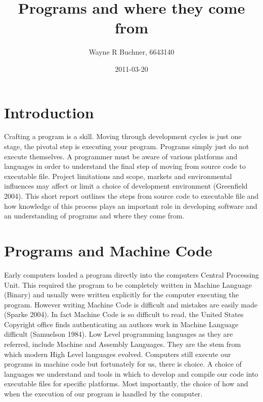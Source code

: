 \documentclass[a4paper]{article}
\title{Programs and where they come from}
\author{Wayne R Buchner, 6643140}
\date{2011-03-20}
\begin{document}
\ifpdf
{}
\else
{}
\fi

\maketitle


\section*{Introduction}
Crafting a program is a skill. Moving through development cycles is just one stage, the pivotal step is executing your program. Programs simply just do not execute themselves. A programmer must be aware of various platforms and languages in order to understand the final step of moving from source code to executable file. Project limitations and scope, markets and environmental influences may affect or limit a choice of development environment (Greenfield 2004). This short report outlines the steps from source code to executable file and how knowledge of this process plays an important role in developing software and an understanding of programs and where they come from. 

\section*{Programs and Machine Code}
Early computers loaded a program directly into the computers Central Processing Unit. This required the program to be completely written in Machine Language (Binary) and usually were written explicitly for the computer executing the program. However writing Machine Code is difficult and mistakes are easily made (Sparke 2004). In fact Machine Code is so difficult to read, the United States Copyright office finds authenticating an authors work in Machine Language difficult (Samuelson 1984). Low Level programming languages as they are referred, include Machine and Assembly Languages. They are the stem from which modern High Level languages evolved. Computers still execute our programs in machine code but fortunately for us, there is choice. A choice of languages we understand and tools in which to develop and compile our code into executable files for specific platforms. Most importantly, the choice of how and when the execution of our program is handled by the computer.
\end{document}
